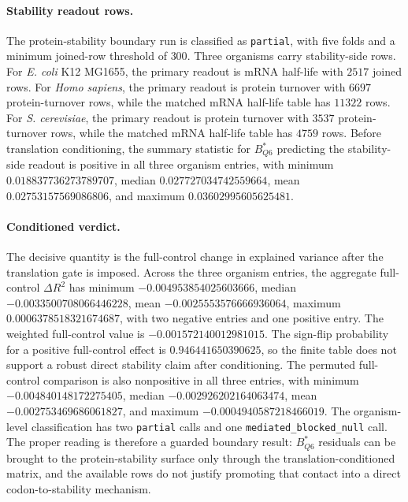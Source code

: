 \paragraph{Stability readout rows.}
The protein-stability boundary run is classified as \texttt{partial}, with five folds and a minimum joined-row threshold of $300$. Three organisms carry stability-side rows. For \emph{E. coli} K12 MG1655, the primary readout is $\mathrm{mRNA}$ half-life with $2517$ joined rows. For \emph{Homo sapiens}, the primary readout is protein turnover with $6697$ protein-turnover rows, while the matched $\mathrm{mRNA}$ half-life table has $11322$ rows. For \emph{S. cerevisiae}, the primary readout is protein turnover with $3537$ protein-turnover rows, while the matched $\mathrm{mRNA}$ half-life table has $4759$ rows. Before translation conditioning, the summary statistic for $B^{\ast}_{Q6}$ predicting the stability-side readout is positive in all three organism entries, with minimum $0.018837736273789707$, median $0.027727034742559664$, mean $0.02753157569086806$, and maximum $0.03602995605625481$.

\paragraph{Conditioned verdict.}
The decisive quantity is the full-control change in explained variance after the translation gate is imposed. Across the three organism entries, the aggregate full-control $\Delta R^2$ has minimum $-0.004953854025603666$, median $-0.0033500708066446228$, mean $-0.0025553576666936064$, maximum $0.0006378518321674687$, with two negative entries and one positive entry. The weighted full-control value is $-0.001572140012981015$. The sign-flip probability for a positive full-control effect is $0.946441650390625$, so the finite table does not support a robust direct stability claim after conditioning. The permuted full-control comparison is also nonpositive in all three entries, with minimum $-0.004840148172275405$, median $-0.002926202164063474$, mean $-0.002753469686061827$, and maximum $-0.0004940587218466019$. The organism-level classification has two \texttt{partial} calls and one \texttt{mediated\_blocked\_null} call. The proper reading is therefore a guarded boundary result: $B^{\ast}_{Q6}$ residuals can be brought to the protein-stability surface only through the translation-conditioned matrix, and the available rows do not justify promoting that contact into a direct codon-to-stability mechanism.


